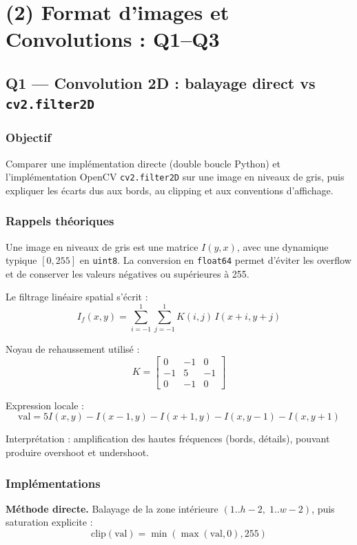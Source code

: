 \documentclass[11pt,a4paper]{article}
\begin{document}
\section{(2) Format d'images et Convolutions : Q1--Q3}

\subsection{Q1 --- Convolution 2D : balayage direct vs \texttt{cv2.filter2D}}

\subsubsection{Objectif}
Comparer une implémentation directe (double boucle Python) et l'implémentation OpenCV \texttt{cv2.filter2D} sur une image en niveaux de gris, puis expliquer les écarts dus aux bords, au clipping et aux conventions d'affichage.

\subsubsection{Rappels théoriques}
Une image en niveaux de gris est une matrice \(I(y,x)\), avec une dynamique typique \([0,255]\) en \texttt{uint8}. La conversion en \texttt{float64} permet d'éviter les overflow et de conserver les valeurs négatives ou supérieures à 255.

Le filtrage linéaire spatial s'écrit :
\[
I_f(x,y)=\sum_{i=-1}^{1}\sum_{j=-1}^{1}K(i,j)\,I(x+i,y+j)
\]

Noyau de rehaussement utilisé :
\[
K=\begin{bmatrix}
0 & -1 & 0 \\
-1 & 5 & -1 \\
0 & -1 & 0
\end{bmatrix}
\]

Expression locale :
\[
\text{val}=5I(x,y)-I(x-1,y)-I(x+1,y)-I(x,y-1)-I(x,y+1)
\]

Interprétation : amplification des hautes fréquences (bords, détails), pouvant produire overshoot et undershoot.

\subsubsection{Implémentations}
\textbf{Méthode directe.} Balayage de la zone intérieure \((1..h-2,\;1..w-2)\), puis saturation explicite :
\[
\mathrm{clip}(\text{val})=\min(\max(\text{val},0),255)
\]
\end{document}
